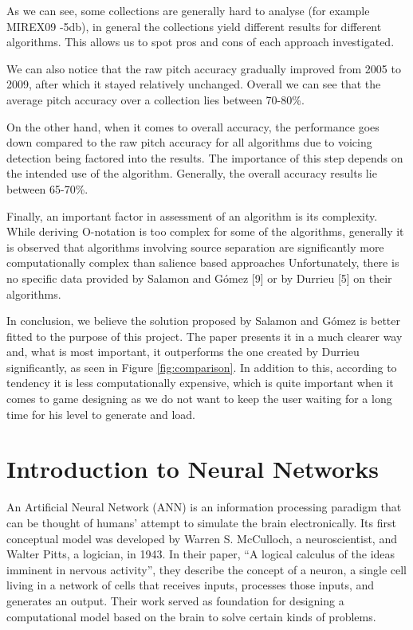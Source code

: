 As we can see, some collections are generally hard to analyse (for example MIREX09 -5db), in general the collections yield different results for different algorithms. This allows us to spot pros and cons of each approach investigated.

We can also notice that the raw pitch accuracy gradually improved from 2005 to 2009, after which it stayed relatively unchanged. Overall we can see that the average pitch accuracy over a collection lies between 70-80\%.

On the other hand, when it comes to overall accuracy, the performance goes down compared to the raw pitch accuracy for all algorithms due to voicing detection being factored into the results. The importance of this step depends on the intended use of the algorithm. Generally, the overall accuracy results lie between 65-70\%.

Finally, an important factor in assessment of an algorithm is its complexity. While deriving O-notation is too complex for some of the algorithms, generally it is observed that algorithms involving source separation are significantly more computationally complex than salience based approaches Unfortunately, there is no specific data provided by Salamon and G\'{o}mez [9] or by Durrieu [5] on their algorithms.

In conclusion, we believe the solution proposed by Salamon and G\'{o}mez is better fitted to the purpose of this project. The paper presents it in a much clearer way and, what is most important, it outperforms the one created by Durrieu significantly, as seen in Figure \ref{fig:comparison}. In addition to this, according to tendency it is less computationally expensive, which is quite important when it comes to game designing as we do not want to keep the user waiting for a long time for his level to generate and load.

\vspace{20pt}


\section{Introduction to Neural Networks}
An Artificial Neural Network (ANN) is an information processing paradigm that can be thought of humans' attempt to simulate the brain electronically. Its first conceptual model was developed by Warren S. McCulloch, a neuroscientist, and Walter Pitts, a logician, in 1943. In their paper, ``A logical calculus of the ideas imminent in nervous activity'', they describe the concept of a neuron, a single cell living in a network of cells that receives inputs, processes those inputs, and generates an output. Their work served as foundation for designing a computational model based on the brain to solve certain kinds of problems.

